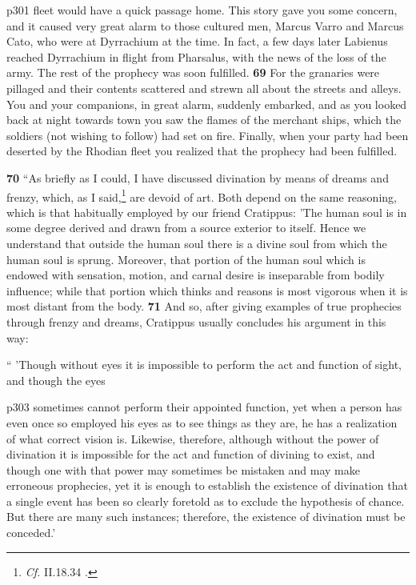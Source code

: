 p301 fleet would have a quick passage home. This story gave you some concern, and it caused very great alarm to those cultured men, Marcus Varro and Marcus Cato, who were at Dyrrachium at the time. In fact, a few days later Labienus reached Dyrrachium in flight from Pharsalus, with the news of the loss of the army. The rest of the prophecy was soon fulfilled. \textbf{69} For the granaries were pillaged and their contents scattered and strewn all about the streets and alleys. You and your companions, in great alarm, suddenly embarked, and as you looked back at night towards town you saw the flames of the merchant ships, which the soldiers (not wishing to follow) had set on fire. Finally, when your party had been deserted by the Rhodian fleet you realized that the prophecy had been fulfilled.

\textbf{70} ``As briefly as I could, I have discussed divination by means of dreams and frenzy, which, as I said,\texthebrew{}\footnote{\emph{Cf.}
II.18.34 .

} are devoid of art. Both depend on the same reasoning, which is that habitually employed by our friend Cratippus: 'The human soul is in some degree derived and drawn from a source exterior to itself. Hence we understand that outside the human soul there is a divine soul from which the human soul is sprung. Moreover, that portion of the human soul which is endowed with sensation, motion, and carnal desire is inseparable from bodily influence; while that portion which thinks and reasons is most vigorous when it is most distant from the body. \textbf{71} And so, after giving examples of true prophecies through frenzy and dreams, Cratippus usually concludes his argument in this way:

`` 'Though without eyes it is impossible to perform the act and function of sight, and though the eyes

p303 sometimes cannot perform their appointed function, yet when a person has even once so employed his eyes as to see things as they are, he has a realization of what correct vision is. Likewise, therefore, although without the power of divination it is impossible for the act and function of divining to exist, and though one with that power may sometimes be mistaken and may make erroneous prophecies, yet it is enough to establish the existence of divination that a single event has been so clearly foretold as to exclude the hypothesis of chance. But there are many such instances; therefore, the existence of divination must be conceded.'

